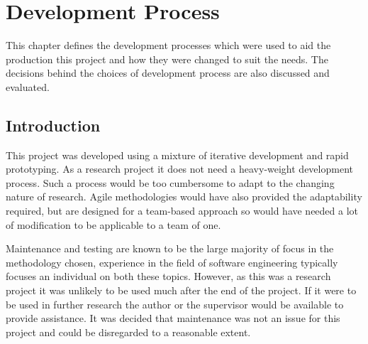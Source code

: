 \chapter{Development Process}




This chapter defines the development processes which were used to aid the production this project and how they
were changed to suit the needs. The decisions behind the choices
of development process are also discussed and evaluated.

\section{Introduction}
This project was developed using a mixture of iterative development and rapid prototyping. As a
research project it does not need a heavy-weight development process. Such a process would be
too cumbersome to adapt to the changing nature of research. Agile methodologies would have also 
provided the adaptability required, but are designed for a team-based approach so would have
needed a lot of modification to be applicable to a team of one.

Maintenance and testing are known to be the large majority of focus in the methodology chosen,
experience in the field of software engineering typically focuses an individual on both these 
topics. However, as this was a research project it was unlikely to be used much after the end of 
the project. If it were to be used in further research the author or the supervisor would 
be available to provide assistance. It was decided that maintenance was not an issue for this project
and could be disregarded to a reasonable extent. 

